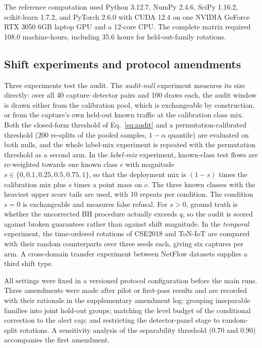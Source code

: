 \documentclass[a4paper,fleqn]{cas-dc}
\begin{document}
The reference computation used Python 3.12.7, NumPy 2.4.6, SciPy 1.16.2, scikit-learn 1.7.2, and PyTorch 2.6.0 with CUDA 12.4 on one NVIDIA GeForce RTX 3050 6GB laptop GPU and a 12-core CPU. The complete matrix required 108.0 machine-hours, including 35.6 hours for held-out-family rotations.

\subsection{Shift experiments and protocol amendments}
Three experiments test the audit. The \emph{audit-null} experiment measures its size directly: over all 40 capture--detector pairs and 100 draws each, the audit window is drawn either from the calibration pool, which is exchangeable by construction, or from the capture's own held-out known traffic at the calibration class mix. Both the closed-form threshold of Eq.~\eqref{eq:audit} and a permutation-calibrated threshold (200 re-splits of the pooled samples, $1-\alpha$ quantile) are evaluated on both nulls, and the whole label-mix experiment is repeated with the permutation threshold as a second arm. In the \emph{label-mix} experiment, known-class test flows are re-weighted towards one known class $c$ with magnitude $s\in\{0,0.1,0.25,0.5,0.75,1\}$, so that the deployment mix is $(1-s)$ times the calibration mix plus $s$ times a point mass on $c$. The three known classes with the heaviest upper score tails are used, with 10 repeats per condition. The condition $s=0$ is exchangeable and measures false refusal. For $s>0$, ground truth is whether the uncorrected BH procedure actually exceeds $q$, so the audit is scored against broken guarantees rather than against shift magnitude. In the \emph{temporal} experiment, the time-ordered rotations of CSE2018 and ToN-IoT are compared with their random counterparts over three seeds each, giving six captures per arm. A cross-domain transfer experiment between NetFlow datasets supplies a third shift type.

All settings were fixed in a versioned protocol configuration before the main runs. Three amendments were made after pilot or first-pass results and are recorded with their rationale in the supplementary amendment log: grouping inseparable families into joint hold-out groups; matching the level budget of the conditional correction to the alert cap; and restricting the detector-panel stage to random-split rotations. A sensitivity analysis of the separability threshold (0.70 and 0.90) accompanies the first amendment.
\end{document}

